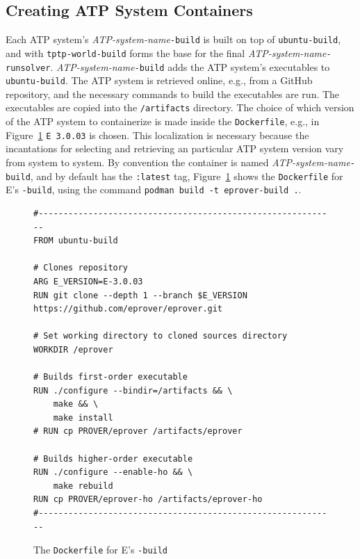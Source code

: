 \documentclass{easychair}
\begin{document}
\subsection{Creating ATP System Containers}
\label{BuildingATPSystemImages}

Each ATP system's {\em ATP-system-name}{\tt-build} is built on top of {\tt ubuntu-build}, and 
with {\tt tptp-world-build} forms the base for the final {\em ATP-system-name}{\tt -runsolver}.
{\em ATP-system-name}{\tt-build} adds the ATP system's executables to {\tt ubuntu-build}.
The ATP system is retrieved online, e.g., from a GitHub repository, and the necessary commands
to build the executables are run.
The executables are copied into the {\tt /artifacts} directory.
The choice of which version of the ATP system to containerize is made inside the {\tt Dockerfile},
e.g., in Figure~\ref{E---build} {\tt E 3.0.03} is chosen.
This localization is necessary because the incantations for selecting and retrieving an
particular ATP system version vary from system to system.
By convention the container is named {\em ATP-system-name}{\tt -build}, and by default has
the {\tt :latest} tag,
Figure~\ref{E---build} shows the {\tt Dockerfile} for E's {\tt -build}, using the command 
{\tt podman~build~-t~eprover-build~.}.

\begin{figure}[htb]
{\small
\begin{verbatim}
#------------------------------------------------------------
FROM ubuntu-build

# Clones repository
ARG E_VERSION=E-3.0.03
RUN git clone --depth 1 --branch $E_VERSION https://github.com/eprover/eprover.git

# Set working directory to cloned sources directory
WORKDIR /eprover

# Builds first-order executable
RUN ./configure --bindir=/artifacts && \
    make && \
    make install
# RUN cp PROVER/eprover /artifacts/eprover

# Builds higher-order executable
RUN ./configure --enable-ho && \
    make rebuild
RUN cp PROVER/eprover-ho /artifacts/eprover-ho
#------------------------------------------------------------
\end{verbatim}
}
\caption{The {\tt Dockerfile} for E's {\tt -build}}
\label{E---build}
\end{figure}
\end{document}
